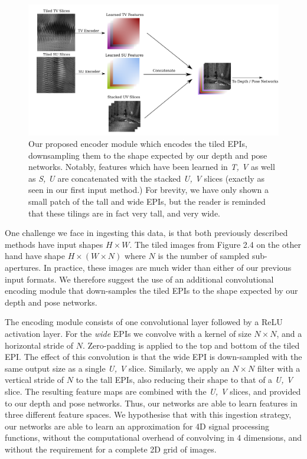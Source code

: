 \begin{figure}[h]
    \centering 
    \includegraphics[width=6in]{images/encoderpipe.png}
    \caption[An encoder module for extracting features from EPIs]{Our proposed encoder module which encodes the tiled EPIs, downsampling them to the shape expected by our depth and pose networks. Notably, features which have been learned in \textit{T, V} as well as \textit{S, U} are concatenated with the stacked \textit{U, V} slices (exactly as seen in our first input method.) For brevity, we have only shown a small patch of the tall and wide EPIs, but the reader is reminded that these tilings are in fact very tall, and very wide.}
\end{figure}

\newpage

One challenge we face in ingesting this data, is that both previously described methods have input shapes $H \times W$. The tiled images from Figure 2.4 on the other hand have shape $H \times (W \times N)$ where $N$ is the number of sampled sub-apertures. In practice, these images are much wider than either of our previous input formats. We therefore suggest the use of an additional convolutional encoding module that down-samples the tiled EPIs to the shape expected by our depth and pose networks.

The encoding module consists of one convolutional layer followed by a ReLU activation layer. For the \textit{wide} EPIs we convolve with a kernel of size $N \times N$, and a horizontal stride of $N$. Zero-padding is applied to the top and bottom of the tiled EPI. The effect of this convolution is that the wide EPI is down-sampled with the same output size as a single \textit{U, V} slice. Similarly, we apply an $N \times N$ filter with a vertical stride of $N$ to the tall EPIs, also reducing their shape to that of a \textit{U, V} slice. The resulting feature maps are combined with the \textit{U, V} slices, and provided to our depth and pose networks. Thus, our networks are able to learn features in three different feature spaces. We hypothesise that with this ingestion strategy, our networks are able to learn an approximation for 4D signal processing functions, without the computational overhead of convolving in 4 dimensions, and without the requirement for a complete 2D grid of images.


